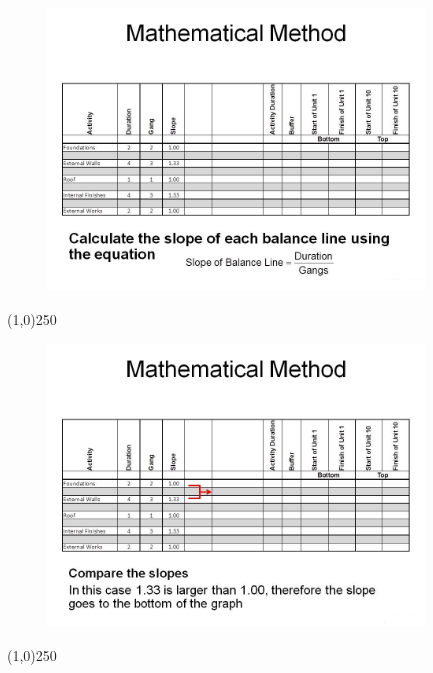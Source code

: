 \begin{frame}
\begin{figure}
	\centering
		\includegraphics[width = 10.0cm]{oldnotes/Slide272.jpg}
\end{figure}
\end{frame}
\begin{center}\line(1,0){250}\end{center}






\begin{frame}
\begin{figure}
	\centering
		\includegraphics[width = 10.0cm]{oldnotes/Slide273.jpg}
\end{figure}
\end{frame}
\begin{center}\line(1,0){250}\end{center}






